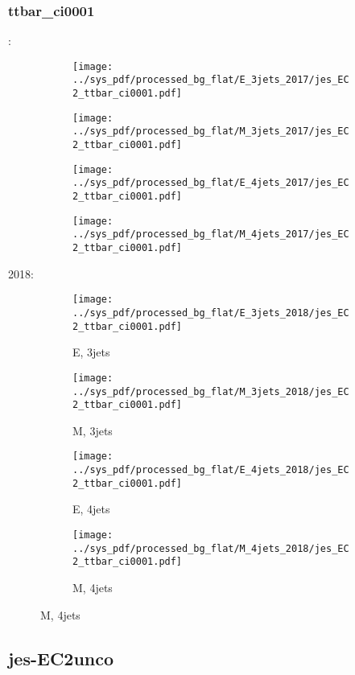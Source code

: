\documentclass{beamer}
\begin{document}
\begin{frame}
\frametitle{ttbar_ci0001}
\fontsize{5}{1}:
\begin{figure}
\centering
\begin{subfigure}[b]{0.24\textwidth}
\texttt{[image: ../sys\_pdf/processed\_bg\_flat/E\_3jets\_2017/jes\_EC2\_ttbar\_ci0001.pdf]}
\end{subfigure}
\begin{subfigure}[b]{0.24\textwidth}
\texttt{[image: ../sys\_pdf/processed\_bg\_flat/M\_3jets\_2017/jes\_EC2\_ttbar\_ci0001.pdf]}
\end{subfigure}
\begin{subfigure}[b]{0.24\textwidth}
\texttt{[image: ../sys\_pdf/processed\_bg\_flat/E\_4jets\_2017/jes\_EC2\_ttbar\_ci0001.pdf]}
\end{subfigure}
\begin{subfigure}[b]{0.24\textwidth}
\texttt{[image: ../sys\_pdf/processed\_bg\_flat/M\_4jets\_2017/jes\_EC2\_ttbar\_ci0001.pdf]}
\end{subfigure}
\end{figure}
2018:
\begin{figure}
\centering
\begin{subfigure}[b]{0.24\textwidth}
\texttt{[image: ../sys\_pdf/processed\_bg\_flat/E\_3jets\_2018/jes\_EC2\_ttbar\_ci0001.pdf]}
\captionsetup{font=tiny}
\caption{E, 3jets}
\end{subfigure}
\begin{subfigure}[b]{0.24\textwidth}
\texttt{[image: ../sys\_pdf/processed\_bg\_flat/M\_3jets\_2018/jes\_EC2\_ttbar\_ci0001.pdf]}
\captionsetup{font=tiny}
\caption{M, 3jets}
\end{subfigure}
\begin{subfigure}[b]{0.24\textwidth}
\texttt{[image: ../sys\_pdf/processed\_bg\_flat/E\_4jets\_2018/jes\_EC2\_ttbar\_ci0001.pdf]}
\captionsetup{font=tiny}
\caption{E, 4jets}
\end{subfigure}
\begin{subfigure}[b]{0.24\textwidth}
\texttt{[image: ../sys\_pdf/processed\_bg\_flat/M\_4jets\_2018/jes\_EC2\_ttbar\_ci0001.pdf]}
\captionsetup{font=tiny}
\caption{M, 4jets}
\end{subfigure}
\end{figure}
\end{frame}


\subsection{jes-EC2unco}
\end{document}
